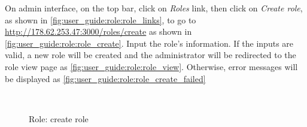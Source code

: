 On admin interface, on the top bar, click on \emph{Roles} link, then click on \emph{Create role}, as shown in \autoref{fig:user_guide:role:role_links}, 
to go to \href{http://178.62.253.47:3000/roles/create}{http://178.62.253.47:3000/roles/create} as shown in \autoref{fig:user_guide:role:role_create}.
Input the role's information.
If the inputs are valid, a new role will be created and the administrator will be redirected to the role view page as \autoref{fig:user_guide:role:role_view}.
Otherwise, error messages will be displayed as \autoref{fig:user_guide:role:role_create_failed}

\begin{figure}[bth]
\myfloatalign
{} \quad
{} \\
\caption[Role: create role]{Role: create role}
\label{fig:user_guide:role:role_create}
\end{figure}


